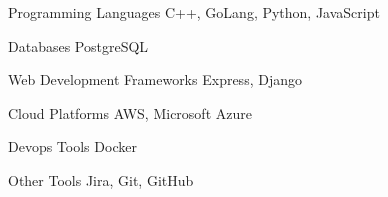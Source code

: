 

\begin{cvskills}

        \cvskill
          {Programming Languages} %
          {C++, GoLang, Python, JavaScript} %
        

        \cvskill
          {Databases} %
          {PostgreSQL} %
        

        \cvskill
          {Web Development Frameworks} %
          {Express, Django} %
        

        \cvskill
          {Cloud Platforms} %
          {AWS, Microsoft Azure} %
        

        \cvskill
          {Devops Tools} %
          {Docker} %
        

        \cvskill
          {Other Tools} %
          {Jira, Git, GitHub} %
        
\end{cvskills}
